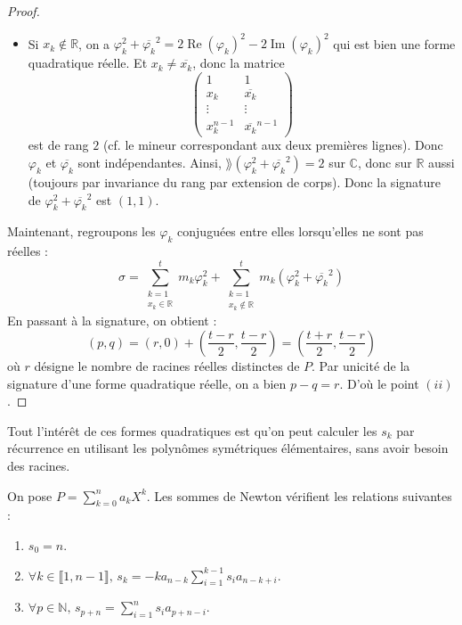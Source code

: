 \begin{proof}
\begin{itemize}
      \item Si $x_k \notin \mathbb{R}$, on a $\varphi_k^2 + \overline{\varphi_k}^2 = 2 \operatorname{Re}(\varphi_k)^2 - 2 \operatorname{Im}(\varphi_k)^2$ qui est bien une forme quadratique réelle. Et $x_k \neq \overline{x_k}$, donc la matrice
      \[ \begin{pmatrix} 1 & 1 \\ x_k & \overline{x_k} \\ \vdots & \vdots \\ x_k^{n-1} & \overline{x_k}^{n-1} \end{pmatrix} \]
      est de rang $2$ (cf. le mineur correspondant aux deux premières lignes). Donc $\varphi_k$ et $\overline{\varphi_k}$ sont indépendantes. Ainsi, $\rang(\varphi_k^2 + \overline{\varphi_k}^2) = 2$ sur $\mathbb{C}$, donc sur $\mathbb{R}$ aussi (toujours par invariance du rang par extension de corps). Donc la signature de $\varphi_k^2 + \overline{\varphi_k}^2$ est $(1, 1)$.
    \end{itemize}
    Maintenant, regroupons les $\varphi_k$ conjuguées entre elles lorsqu'elles ne sont pas réelles :
    \[ \sigma = \sum_{\substack{k=1 \\ x_k \in \mathbb{R}}}^t m_k \varphi_k^2 + \sum_{\substack{k=1 \\ x_k \notin \mathbb{R}}}^t m_k (\varphi_k^2 + \overline{\varphi_k}^2) \]
    En passant à la signature, on obtient :
    \[ (p, q) = (r, 0) + \left( \frac{t-r}{2}, \frac{t-r}{2} \right) = \left( \frac{t+r}{2}, \frac{t-r}{2} \right) \]
    où $r$ désigne le nombre de racines réelles distinctes de $P$. Par unicité de la signature d'une forme quadratique réelle, on a bien $p-q=r$. D'où le point $(ii)$.
  \end{proof}

  \begin{remark}
    Tout l'intérêt de ces formes quadratiques est qu'on peut calculer les $s_k$ par récurrence en utilisant les polynômes symétriques élémentaires, sans avoir besoin des racines.
  \end{remark}


  \begin{proposition}
    On pose $P = \sum_{k=0}^n a_k X^k$. Les sommes de Newton vérifient les relations suivantes :
    \begin{enumerate}[label={\bfseries(\roman*)}]
      \item $s_0 = n$.
      \item $\forall k \in \llbracket 1, n-1 \rrbracket, \, s_k = -k a_{n-k} \sum_{i=1}^{k-1} s_i a_{n-k+i}$.
      \item $\forall p \in \mathbb{N}, \, s_{p+n} = \sum_{i=1}^{n} s_i a_{p+n-i}$.
    \end{enumerate}
  \end{proposition}

